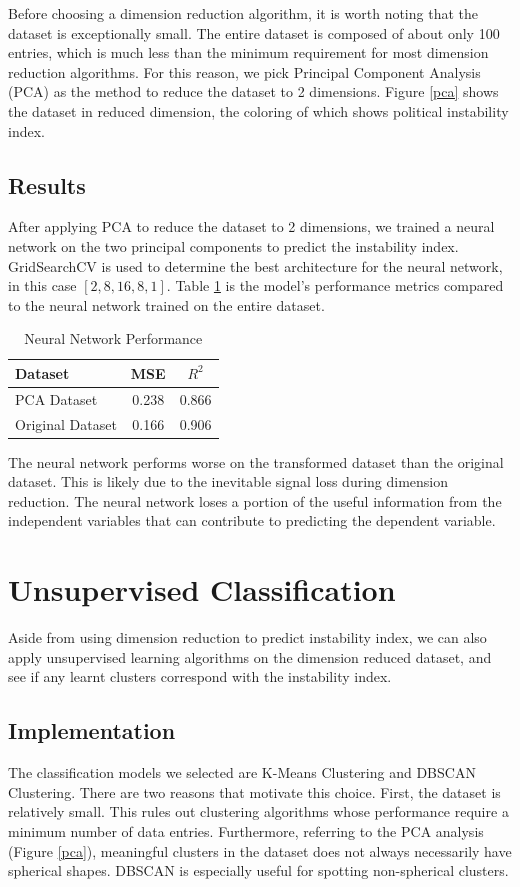 \documentclass[twocolumn]{article}
\begin{document}
Before choosing a dimension reduction algorithm, it is worth noting that the dataset is exceptionally small. The entire dataset is composed of about only 100 entries, which is much less than the minimum requirement for most dimension reduction algorithms. For this reason, we pick Principal Component Analysis (PCA) as the method to reduce the dataset to 2 dimensions. Figure \ref{pca} shows the dataset in reduced dimension, the coloring of which shows political instability index.

\subsection{Results}
After applying PCA to reduce the dataset to 2 dimensions, we trained a neural network on the two principal components to predict the instability index. GridSearchCV is used to determine the best architecture for the neural network, in this case $[2,8,16,8,1]$. Table \ref{pca_pred} is the model's performance metrics compared to the neural network trained on the entire dataset.

\begin{table}[h!]
    \centering
    \begin{tabular}{lcc}
        \toprule
        Dataset & MSE & $R^2$ \\
        \midrule
        PCA Dataset & 0.238 & 0.866 \\
        Original Dataset& 0.166 & 0.906 \\
        \bottomrule
    \end{tabular}
    \caption{Neural Network Performance}
    \label{pca_pred}
\end{table}

The neural network performs worse on the transformed dataset than the original dataset. This is likely due to the inevitable signal loss during dimension reduction. The neural network loses a portion of the useful information from the independent variables that can contribute to predicting the dependent variable.

\section{Unsupervised Classification}
\label{unsup_class}
Aside from using dimension reduction to predict instability index, we can also apply unsupervised learning algorithms on the dimension reduced dataset, and see if any learnt clusters correspond with the instability index.
\subsection{Implementation}
The classification models we selected are K-Means Clustering and DBSCAN Clustering. There are two reasons that motivate this choice. First, the dataset is relatively small. This rules out clustering algorithms whose performance require a minimum number of data entries. Furthermore, referring to the PCA analysis (Figure \ref{pca}), meaningful clusters in the dataset does not always necessarily have spherical shapes. DBSCAN is especially useful for spotting non-spherical clusters.
\end{document}
